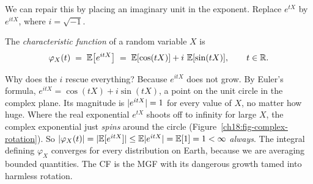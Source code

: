 We can repair this by placing an imaginary unit in the exponent. Replace $e^{tX}$ by $e^{itX}$, where $i=\sqrt{-1}$.

\begin{definition}
\label{ch18:def-cf}
The \emph{characteristic function} of a random variable $X$ is
\[
  \varphi_X(t) \;=\; \operatorname{\mathbb{E}}\!\left[e^{itX}\right]
              \;=\; \operatorname{\mathbb{E}}[\cos(tX)] + i\,\operatorname{\mathbb{E}}[\sin(tX)],
  \qquad t\in\mathbb{R} .
\]
\end{definition}

\begin{happeningbox}
Why does the $i$ rescue everything? Because $e^{itX}$ does not grow. By Euler's
formula, $e^{itX}=\cos(tX)+i\sin(tX)$, a point on the unit circle in the complex
plane. Its magnitude is $\lvert e^{itX}\rvert=1$ for every value of $X$, no matter how
huge. Where the real exponential $e^{tX}$ shoots off to infinity for large $X$,
the complex exponential just \emph{spins} around the circle (Figure~\ref{ch18:fig-complex-rotation}). So
$\lvert\varphi_X(t)\rvert=\lvert\operatorname{\mathbb{E}}[e^{itX}]\rvert\le \operatorname{\mathbb{E}}\lvert e^{itX}\rvert = \operatorname{\mathbb{E}}[1] = 1 < \infty$
\emph{always}. The integral defining $\varphi_X$ converges for every
distribution on Earth, because we are averaging bounded quantities. The CF is
the MGF with its dangerous growth tamed into harmless rotation.
\end{happeningbox}

